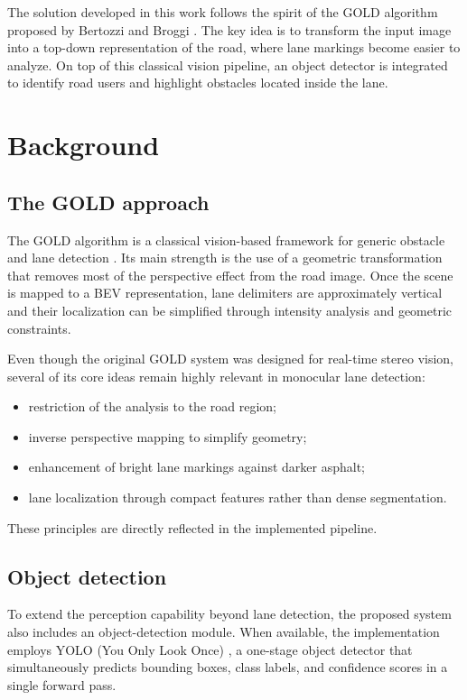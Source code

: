 \documentclass[conference]{IEEEtran}
\begin{document}
The solution developed in this work follows the spirit of the GOLD algorithm proposed by Bertozzi and Broggi \cite{gold_paper}. The key idea is to transform the input image into a top-down representation of the road, where lane markings become easier to analyze. On top of this classical vision pipeline, an object detector is integrated to identify road users and highlight obstacles located inside the lane.

\section{Background}
\subsection{The GOLD approach}
The GOLD algorithm is a classical vision-based framework for generic obstacle and lane detection \cite{gold_paper}. Its main strength is the use of a geometric transformation that removes most of the perspective effect from the road image. Once the scene is mapped to a BEV representation, lane delimiters are approximately vertical and their localization can be simplified through intensity analysis and geometric constraints.

Even though the original GOLD system was designed for real-time stereo vision, several of its core ideas remain highly relevant in monocular lane detection:
\begin{itemize}
    \item restriction of the analysis to the road region;
    \item inverse perspective mapping to simplify geometry;
    \item enhancement of bright lane markings against darker asphalt;
    \item lane localization through compact features rather than dense segmentation.
\end{itemize}

These principles are directly reflected in the implemented pipeline.

\subsection{Object detection}

To extend the perception capability beyond lane detection, the proposed system also includes an object-detection module. When available, the implementation employs YOLO (You Only Look Once) \cite{yolo}, a one-stage object detector that simultaneously predicts bounding boxes, class labels, and confidence scores in a single forward pass.
\end{document}
